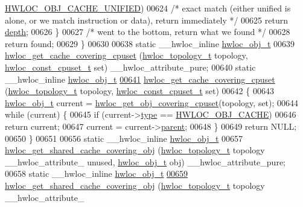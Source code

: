 \begin{DoxyCode}
      \hyperlink{a00041_gga791c9875c8fe20f3e1e5871e0657e59ba3900b3b2db54941aac249e5a638a2d7a}{HWLOC_OBJ_CACHE_UNIFIED})
00624       \textcolor{comment}{/* exact match (either unified is alone, or we match instruction or data), 
      return immediately */}
00625       \textcolor{keywordflow}{return} \hyperlink{a00016_a9d82690370275d42d652eccdea5d3ee5}{depth};
00626   \}
00627   \textcolor{comment}{/* went to the bottom, return what we found */}
00628   \textcolor{keywordflow}{return} found;
00629 \}
00630 
00638 \textcolor{keyword}{static} \_\_hwloc\_inline \hyperlink{a00016}{hwloc_obj_t}
00639 \hyperlink{a00057_ga2f936fd9a9c62f6d9b9951de3062e889}{hwloc_get_cache_covering_cpuset} (\hyperlink{a00039_ga9d1e76ee15a7dee158b786c30b6a6e38}{hwloc_topology_t} topology, \hyperlink{a00040_ga1f784433e9b606261f62d1134f6a3b25}{hwloc_const_cpuset_t} 
      \textcolor{keyword}{set}) \_\_hwloc\_attribute\_pure;
00640 static \_\_hwloc\_inline \hyperlink{a00016}{hwloc_obj_t}
\hypertarget{a00031_source_l00641}{}\hyperlink{a00057_ga2f936fd9a9c62f6d9b9951de3062e889}{00641} \hyperlink{a00057_ga2f936fd9a9c62f6d9b9951de3062e889}{hwloc_get_cache_covering_cpuset} (\hyperlink{a00039_ga9d1e76ee15a7dee158b786c30b6a6e38}{hwloc_topology_t} topology, \hyperlink{a00040_ga1f784433e9b606261f62d1134f6a3b25}{hwloc_const_cpuset_t} 
      set)
00642 \{
00643   \hyperlink{a00016}{hwloc_obj_t} current = \hyperlink{a00055_ga68300dd0ee9c36a7a90f275a59e9af28}{hwloc_get_obj_covering_cpuset}(topology, \textcolor{keyword}{set});
00644   \textcolor{keywordflow}{while} (current) \{
00645     \textcolor{keywordflow}{if} (current->\hyperlink{a00016_acc4f0803f244867e68fe0036800be5de}{type} == \hyperlink{a00041_ggacd37bb612667dc437d66bfb175a8dc55a56ee0b7eca88f363b75b34fdde8c9ddc}{HWLOC_OBJ_CACHE})
00646       \textcolor{keywordflow}{return} current;
00647     current = current->\hyperlink{a00016_adc494f6aed939992be1c55cca5822900}{parent};
00648   \}
00649   \textcolor{keywordflow}{return} NULL;
00650 \}
00651 
00656 \textcolor{keyword}{static} \_\_hwloc\_inline \hyperlink{a00016}{hwloc_obj_t}
00657 \hyperlink{a00057_ga000e08a1da039130daa072e77713bb43}{hwloc_get_shared_cache_covering_obj} (\hyperlink{a00039_ga9d1e76ee15a7dee158b786c30b6a6e38}{hwloc_topology_t} topology \_\_hwloc\_attribute\_
      unused, \hyperlink{a00016}{hwloc_obj_t} obj) \_\_hwloc\_attribute\_pure;
00658 \textcolor{keyword}{static} \_\_hwloc\_inline \hyperlink{a00016}{hwloc_obj_t}
\hypertarget{a00031_source_l00659}{}\hyperlink{a00057_ga000e08a1da039130daa072e77713bb43}{00659} \hyperlink{a00057_ga000e08a1da039130daa072e77713bb43}{hwloc_get_shared_cache_covering_obj} (\hyperlink{a00039_ga9d1e76ee15a7dee158b786c30b6a6e38}{hwloc_topology_t} topology \_\_hwloc\_attribute\_

\end{DoxyCode}
